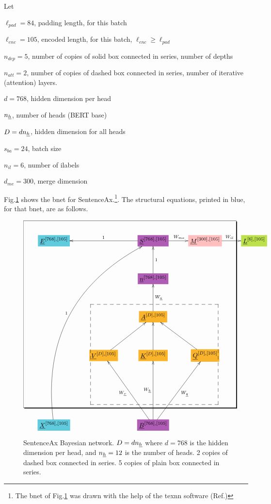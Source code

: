 Let

$\ell_{pad}=84$, padding length, for this batch

$\ell_{enc}=105$, encoded length, for this batch, $\ell_{enc}\geq \ell_{pad}$

$n_{dep}=5$, number of copies of solid box connected in series, number of depths

 $n_{att}=2$, number of copies of
dashed box connected in series, number of iterative (attention) layers.


$d=768$, hidden dimension per head

$n_{\underline{h}}$, number of heads (BERT base)

$D=d n_{\underline{h}}$, hidden dimension
for all heads


$s_{ba}=24$, batch size

$n_{il}=6$, number of ilabels

$d_{me}=300$, merge dimension

Fig.\ref{fig-texnn-for-sentence-ax-bnet}
shows the bnet  for SentenceAx.\footnote{The
bnet of Fig.\ref{fig-texnn-for-sentence-ax-bnet}
was drawn with the help of the texnn software (Ref.\cite{texnn})}. The structural equations, printed in 
blue, for that bnet, are as follows.

\begin{figure}[h!]\centering
$$\xymatrix@R=3.5pc@C=2.5pc{
*+[F*:SkyBlue]{\underline{E}^{[768], [105]}}&&*+[F*:Orchid]{\underline{S}^{[768], [105]}}\ar[ll]_{1}\ar[r]^{W_{me}}&*+[F*:pink]{\underline{M}^{[300], [105]}}\ar[r]^{W_{il}}&*+[F*:SpringGreen]{\underline{L}^{[6], [105]}}
\\
&&*+[F*:Orchid]{\underline{n}^{[768], [105]}}\ar[u]_{1}&&
\\
&&*+[F*:Dandelion]{\underline{A}^{[D], [105]}}\ar[u]_{W_\rva}&&
\\
&*+[F*:Dandelion]{\underline{V}^{[D], [105]}}\ar[ur]&*+[F*:Dandelion]{\underline{K}^{[D], [105]}}\ar[u]&*+[F*:Dandelion]{\underline{Q}^{[D], [105]}}\ar[ul]&
\\
&&&&
\\
*+[F*:SkyBlue]{\underline{X}^{[768], [105]}}\ar@/^5pc/[uuuuurr]^{1}&&*+[F*:Orchid]{\underline{B}^{[768], [105]}}\ar[uu]^{W_\rvk}\ar[uur]_{W_\rvq}\ar[uul]^{W_\rvv}&&
\save
\POS"1,1"."5,1"."1,4"."5,4"!C*+<4.5em>\frm{-,}
\POS"3,2"."5,2"."3,4"."5,4"!C*+<3.5em>\frm{--}
\restore
}$$
\caption{SentenceAx Bayesian network. $D= d n_{\underline{h}}$ where $d=768$ is the hidden dimension per head, and $n_{\underline{h}}=12$ is the number of heads. 2 copies of dashed box connected in series. 5 copies of plain box connected in series.}
\label{fig-texnn-for-sentence-ax-bnet}
\end{figure}

